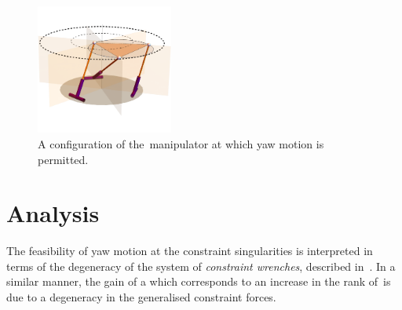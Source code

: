 \documentclass[DD,synopsis]{iitmdiss}
\begin{document}
\begin{figure}[b]
	\centering
	\centering
	\includegraphics[width=0.4\textwidth]{yaw5.pdf}
	\caption{A configuration of the~\rps manipulator at which yaw motion is permitted.}
	\label{fg:yaw}
\end{figure}
\section{Analysis}
The feasibility of yaw motion at the constraint singularities is interpreted in terms of the degeneracy of the system of \emph{constraint wrenches}, described in~\cite{zlatanov2002b}. In a similar manner, the gain of a \dof which corresponds to an increase in the rank of~\bB is due to a degeneracy in the generalised constraint forces.

\begin{singlespace}
	
\end{singlespace}

%
%




\end{document}
